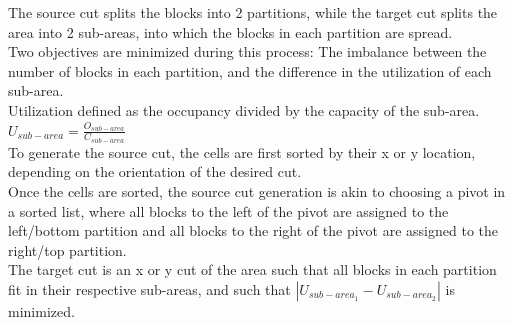 \documentclass{article}
\begin{document}
\begin{multicols}{2}
\begin{itemize}
            The source cut splits the blocks into 2 partitions, while the target cut splits the area into 2 sub-areas, into which the blocks in each partition are spread. \\
            Two objectives are minimized during this process: The imbalance between the number of blocks in each partition, and the difference in the utilization of each sub-area. \\
            Utilization defined as the occupancy divided by the capacity of the sub-area. \\
            \(U_{sub-area} = \frac{O_{sub-area}}{C_{sub-area}}\) \\
            To generate the source cut, the cells are first sorted by their x or y location, depending on the orientation of the desired cut. \\
            Once the cells are sorted, the source cut generation is akin to choosing a pivot in a sorted list, where all blocks to the left of the pivot are assigned to the left/bottom partition and all blocks to the right of the pivot are assigned to the right/top partition. \\
            The target cut is an x or y cut of the area such that all blocks in each partition fit in their respective sub-areas, and such that \( | U_{sub-area_1} 
             - U_{sub-area_2} | \) is minimized.




    \end{itemize}





\end{multicols}
\end{document}
